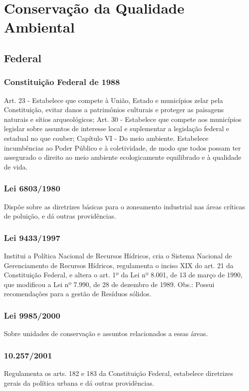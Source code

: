 \section{Conservação da Qualidade Ambiental}

\begin{subapend}
	\subsection{Federal}
	\begin{subsubapend}
		\item \subsubsection{Constituição Federal de 1988}
		Art. 23 - Estabelece que compete à União, Estado e municípios zelar pela Constituição, evitar danos a patrimônios culturais e proteger as paisagens naturais e sítios arqueológicos;
		Art. 30 - Estabelece que compete aos municípios legislar sobre assuntos de interesse local e suplementar a legislação federal e estadual no que couber;
		Capítulo VI - Do meio ambiente. Estabelece incumbências ao Poder Público e à coletividade, de modo que todos possam ter assegurado o direito ao meio ambiente ecologicamente equilibrado e à qualidade de vida.
		\subsubsection{Lei 6803/1980}
		Dispõe sobre as diretrizes básicas para o zoneamento industrial nas áreas críticas de poluição, e dá outras providências.
		\subsubsection{Lei 9433/1997}
		Institui a Política Nacional de Recursos Hídricos, cria o Sistema Nacional de Gerenciamento de Recursos Hídricos, regulamenta o inciso XIX do art. 21 da Constituição Federal, e altera o art. 1º da Lei nº 8.001, de 13 de março de 1990, que modificou a Lei nº 7.990, de 28 de dezembro de 1989. Obs.: Possui recomendações para a gestão de Resíduos sólidos.
		\subsubsection{Lei 9985/2000}
		Sobre unidades de conservação e assuntos relacionados a essas áreas.
		\subsubsection{10.257/2001}
		Regulamenta os arts. 182 e 183 da Constituição Federal, estabelece diretrizes gerais da política urbana e dá outras providências.

\end{subsubapend}
\end{subapend}
